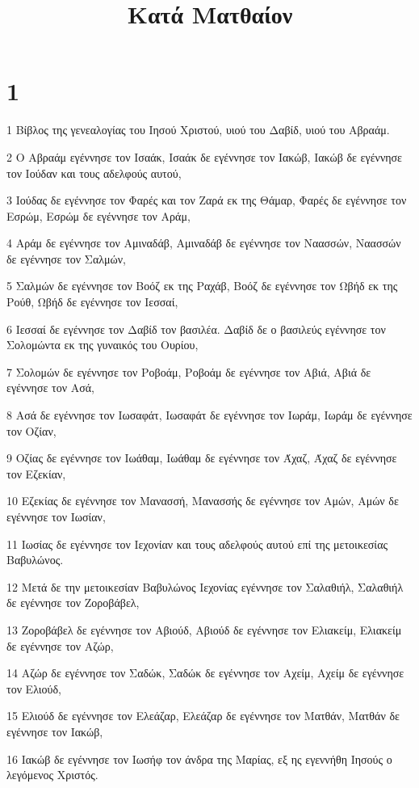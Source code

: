 

\title{Κατά Ματθαίον}


\chapter{1}

\par 1 Βίβλος της γενεαλογίας του Ιησού Χριστού, υιού του Δαβίδ, υιού του Αβραάμ.
\par 2 Ο Αβραάμ εγέννησε τον Ισαάκ, Ισαάκ δε εγέννησε τον Ιακώβ, Ιακώβ δε εγέννησε τον Ιούδαν και τους αδελφούς αυτού,
\par 3 Ιούδας δε εγέννησε τον Φαρές και τον Ζαρά εκ της Θάμαρ, Φαρές δε εγέννησε τον Εσρώμ, Εσρώμ δε εγέννησε τον Αράμ,
\par 4 Αράμ δε εγέννησε τον Αμιναδάβ, Αμιναδάβ δε εγέννησε τον Ναασσών, Ναασσών δε εγέννησε τον Σαλμών,
\par 5 Σαλμών δε εγέννησε τον Βοόζ εκ της Ραχάβ, Βοόζ δε εγέννησε τον Ωβήδ εκ της Ρούθ, Ωβήδ δε εγέννησε τον Ιεσσαί,
\par 6 Ιεσσαί δε εγέννησε τον Δαβίδ τον βασιλέα. Δαβίδ δε ο βασιλεύς εγέννησε τον Σολομώντα εκ της γυναικός του Ουρίου,
\par 7 Σολομών δε εγέννησε τον Ροβοάμ, Ροβοάμ δε εγέννησε τον Αβιά, Αβιά δε εγέννησε τον Ασά,
\par 8 Ασά δε εγέννησε τον Ιωσαφάτ, Ιωσαφάτ δε εγέννησε τον Ιωράμ, Ιωράμ δε εγέννησε τον Οζίαν,
\par 9 Οζίας δε εγέννησε τον Ιωάθαμ, Ιωάθαμ δε εγέννησε τον Άχαζ, Άχαζ δε εγέννησε τον Εζεκίαν,
\par 10 Εζεκίας δε εγέννησε τον Μανασσή, Μανασσής δε εγέννησε τον Αμών, Αμών δε εγέννησε τον Ιωσίαν,
\par 11 Ιωσίας δε εγέννησε τον Ιεχονίαν και τους αδελφούς αυτού επί της μετοικεσίας Βαβυλώνος.
\par 12 Μετά δε την μετοικεσίαν Βαβυλώνος Ιεχονίας εγέννησε τον Σαλαθιήλ, Σαλαθιήλ δε εγέννησε τον Ζοροβάβελ,
\par 13 Ζοροβάβελ δε εγέννησε τον Αβιούδ, Αβιούδ δε εγέννησε τον Ελιακείμ, Ελιακείμ δε εγέννησε τον Αζώρ,
\par 14 Αζώρ δε εγέννησε τον Σαδώκ, Σαδώκ δε εγέννησε τον Αχείμ, Αχείμ δε εγέννησε τον Ελιούδ,
\par 15 Ελιούδ δε εγέννησε τον Ελεάζαρ, Ελεάζαρ δε εγέννησε τον Ματθάν, Ματθάν δε εγέννησε τον Ιακώβ,
\par 16 Ιακώβ δε εγέννησε τον Ιωσήφ τον άνδρα της Μαρίας, εξ ης εγεννήθη Ιησούς ο λεγόμενος Χριστός.

